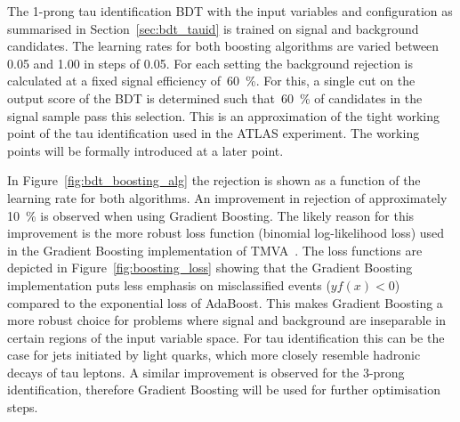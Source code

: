 The 1-prong tau identification BDT with the input variables and configuration as
summarised in Section~\ref{sec:bdt_tauid} is trained on signal and background
\tauhadvis candidates. The learning rates for both boosting algorithms are
varied between 0.05 and 1.00 in steps of 0.05. For each setting the background
rejection is calculated at a fixed signal efficiency of~\SI{60}{\percent}. For
this, a single cut on the output score of the BDT is determined such
that~\SI{60}{\percent} of \tauhadvis candidates in the signal sample pass this
selection. This is an approximation of the tight working point of the tau
identification used in the ATLAS experiment. The working points will be formally
introduced at a later point.

In Figure~\ref{fig:bdt_boosting_alg} the rejection is shown as a function of the
learning rate for both algorithms. An improvement in rejection of approximately
\SI{10}{\percent} is observed when using Gradient Boosting. The likely reason
for this improvement is the more robust loss function (binomial log-likelihood
loss) used in the Gradient Boosting implementation of TMVA~\cite{tmva}. The loss
functions are depicted in Figure~\ref{fig:boosting_loss} showing that the
Gradient Boosting implementation puts less emphasis on misclassified events
($y f(x) < 0$) compared to the exponential loss of AdaBoost. This makes Gradient
Boosting a more robust choice for problems where signal and background are
inseparable in certain regions of the input variable space. For tau
identification this can be the case for jets initiated by light quarks, which
more closely resemble hadronic decays of tau leptons. A similar improvement is
observed for the 3-prong identification, therefore Gradient Boosting will be
used for further optimisation steps.


